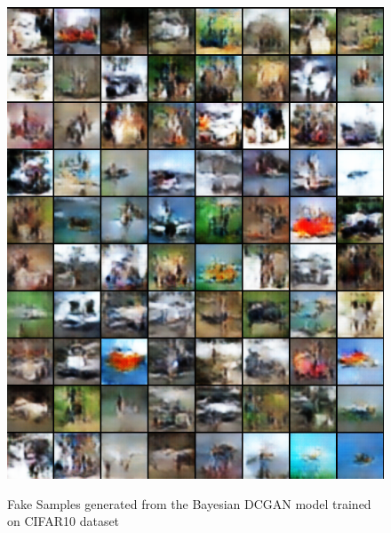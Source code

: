 \begin{figure}[H]
\begin{center}
\includegraphics[height=.88\textheight]{Chapter6/Figs/fake_samples.png}
\label{fig:FakeSamples}
\caption{Fake Samples generated from the Bayesian DCGAN model trained on CIFAR10 dataset}
\end{center}
\end{figure}

